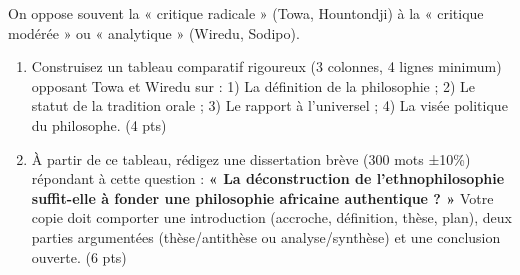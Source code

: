 \documentclass[11pt]{article}
\begin{document}
\begin{exercice}
On oppose souvent la « critique radicale » (Towa, Hountondji) à la « critique modérée » ou « analytique » (Wiredu, Sodipo).
\begin{enumerate}
    \item Construisez un tableau comparatif rigoureux (3 colonnes, 4 lignes minimum) opposant Towa et Wiredu sur : 1) La définition de la philosophie ; 2) Le statut de la tradition orale ; 3) Le rapport à l'universel ; 4) La visée politique du philosophe. (4 pts)
    \item À partir de ce tableau, rédigez une dissertation brève (300 mots ±10\%) répondant à cette question : \textbf{« La déconstruction de l'ethnophilosophie suffit-elle à fonder une philosophie africaine authentique ? »} Votre copie doit comporter une introduction (accroche, définition, thèse, plan), deux parties argumentées (thèse/antithèse ou analyse/synthèse) et une conclusion ouverte. (6 pts)
\end{enumerate}
\end{exercice}
\end{document}
